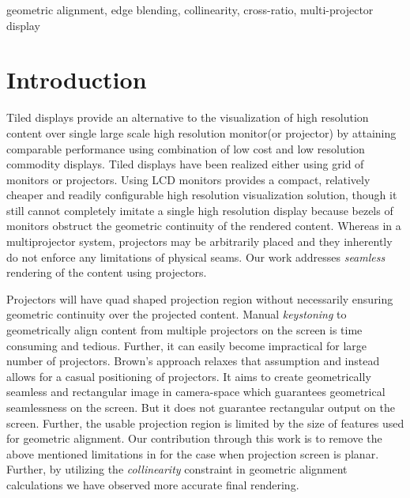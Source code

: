\documentclass[letterpaper,10pt,conference]{/home/pranav/Desktop/Publication_work/latex_class_files/IEEEtran}
\begin{document}
\begin{IEEEkeywords}
geometric alignment, edge blending, collinearity, cross-ratio, multi-projector display
\end{IEEEkeywords}

\section{Introduction}
Tiled displays provide an alternative to the visualization of high resolution content over single large scale high resolution monitor(or projector) by attaining comparable performance using combination of low cost and low resolution commodity displays. Tiled displays have been realized either using grid of monitors\cite{bose,harish} or projectors\cite{brown,judson,raskar,majum}. Using LCD monitors provides a compact, relatively cheaper and readily configurable high resolution visualization solution, though it still cannot completely imitate a single high resolution display because bezels of monitors obstruct the geometric continuity of the rendered content. Whereas in a multiprojector system, projectors may be arbitrarily placed and they inherently do not enforce any limitations of physical seams. Our work addresses \textit{seamless} rendering of the content using projectors. \par
Projectors will have quad shaped projection region without necessarily ensuring geometric continuity over the projected content. Manual \textit{keystoning} to geometrically align content from multiple projectors on the screen is time consuming and tedious. Further, it can easily become impractical for large number of projectors. Brown's\cite{brown} approach relaxes that assumption and instead allows for a casual positioning of projectors. It aims to create geometrically seamless and rectangular image in camera-space which guarantees geometrical seamlessness on the screen. But it does not guarantee rectangular output on the screen. Further, the usable projection region is limited by the size of features used for geometric alignment. Our contribution through this work is to remove the above mentioned limitations in \cite{brown} for the case when projection screen is planar. Further, by utilizing the \textit{collinearity} constraint in geometric alignment calculations we have observed more accurate final rendering.\par
\end{document}
